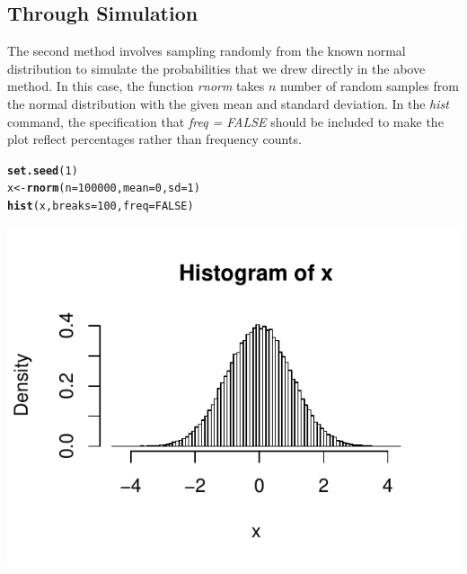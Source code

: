\documentclass{report}\usepackage[]{graphicx}\usepackage[]{color}
\makeatletter
\def\maxwidth{ %
  \ifdim\Gin@nat@width>\linewidth
    \linewidth
  \else
    \Gin@nat@width
  \fi
}
\newcommand{\hlnum}[1]{\textcolor[rgb]{0.686,0.059,0.569}{#1}}%
\newcommand{\hlstd}[1]{\textcolor[rgb]{0.345,0.345,0.345}{#1}}%
\newcommand{\hlkwb}[1]{\textcolor[rgb]{0.69,0.353,0.396}{#1}}%
\newcommand{\hlkwc}[1]{\textcolor[rgb]{0.333,0.667,0.333}{#1}}%
\newcommand{\hlkwd}[1]{\textcolor[rgb]{0.737,0.353,0.396}{\textbf{#1}}}%
\newenvironment{kframe}{%
 \def\at@end@of@kframe{}%
 \ifinner\ifhmode%
  \def\at@end@of@kframe{\end{minipage}}%
  \begin{minipage}{\columnwidth}%
 \fi\fi%
 \def\FrameCommand##1{\hskip\@totalleftmargin \hskip-\fboxsep
 \colorbox{shadecolor}{##1}\hskip-\fboxsep
     \hskip-\linewidth \hskip-\@totalleftmargin \hskip\columnwidth}%
 \MakeFramed {\advance\hsize-\width
   \@totalleftmargin\z@ \linewidth\hsize
   \@setminipage}}%
 {\par\unskip\endMakeFramed%
 \at@end@of@kframe}
\newenvironment{knitrout}{}{} %
\makeatother
\begin{document}
\subsection{Through Simulation}
The second method involves sampling randomly from the known normal distribution to simulate the probabilities that we drew directly in the above method.  In this case, the function \textit{rnorm} takes $n$ number of random samples from the normal distribution with the given mean and standard deviation.  In the \textit{hist} command, the specification that \textit{freq = FALSE} should be included to make the plot reflect percentages rather than frequency counts.  
\begin{knitrout}
\color{fgcolor}\begin{kframe}
\begin{alltt}
\hlkwd{set.seed}\hlstd{(}\hlnum{1}\hlstd{)}
\hlstd{x} \hlkwb{<-} \hlkwd{rnorm}\hlstd{(}\hlkwc{n} \hlstd{=} \hlnum{100000}\hlstd{,} \hlkwc{mean} \hlstd{=} \hlnum{0}\hlstd{,} \hlkwc{sd} \hlstd{=} \hlnum{1}\hlstd{)}
\hlkwd{hist}\hlstd{(x,} \hlkwc{breaks} \hlstd{=} \hlnum{100}\hlstd{,} \hlkwc{freq} \hlstd{=} \hlnum{FALSE}\hlstd{)}
\end{alltt}
\end{kframe}

{\centering \includegraphics[width=\maxwidth]{figure/unnamed-chunk-48-1} 

}



\end{knitrout}
\end{document}

